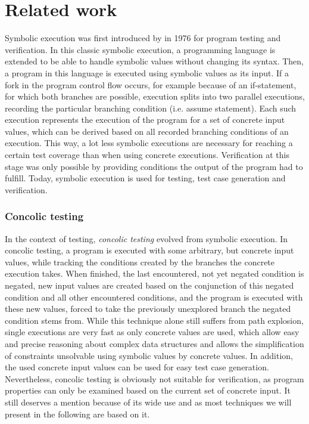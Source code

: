 \chapter{Related work}
Symbolic execution was first introduced by \cite{King1976} in 1976 for program testing and verification.
In this classic symbolic execution, a programming language is extended to be able to handle symbolic values without changing its syntax.
Then, a program in this language is executed using symbolic values as its input.
If a fork in the program control flow occurs, for example because of an if-statement, for which both branches are possible, execution splits into two parallel executions,
recording the particular branching condition (i.e. assume statement).
Each such execution represents the execution of the program for a set of concrete input values, which can be derived based on all recorded branching conditions of an execution.
This way, a lot less symbolic executions are necessary for reaching a certain test coverage than when using concrete executions.
Verification at this stage was only possible by providing conditions the output of the program had to fulfill.
Today, symbolic execution is used for testing, test case generation and verification.

\subsection*{Concolic testing}
In the context of testing, \emph{concolic testing} \cite{Sen2005} \cite{Godefroid2005} \cite{Majumdar2007} evolved from symbolic execution.
In concolic testing, a program is executed with some arbitrary, but concrete input values, while tracking the conditions created by the branches the concrete execution takes.
When finished, the last encountered, not yet negated condition is negated, new input values are created based on the conjunction of this negated condition and all other encountered conditions, and
the program is executed with these new values, forced to take the previously unexplored branch the negated condition stems from.
While this technique alone still suffers from path explosion, single executions are very fast as only concrete values are used, which allow easy and precise reasoning about complex data structures \cite{Burnim2008} and allows the simplification of constraints unsolvable using symbolic values by concrete values.
In addition, the used concrete input values can be used for easy test case generation.
Nevertheless, concolic testing is obviously not suitable for verification, as program properties can only be examined based on the current set of concrete input.
It still deserves a mention because of its wide use and as most techniques we will present in the following are based on it.

